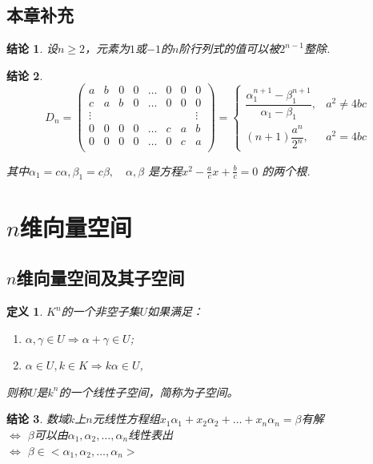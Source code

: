 \documentclass[UTF8]{article}
\newtheorem{defn}{定义}[subsection]
\newtheorem{ccl}{结论}[subsection]
\begin{document}
\subsection{本章补充}
\begin{ccl}
  设$n\ge 2$，元素为$1$或$-1$的$n$阶行列式的值可以被$2^{n-1}$整除.
\end{ccl}
\begin{ccl}
  \[
  D_n=
  \begin{pmatrix}
    a & b & 0 & 0 & \ldots & 0 & 0 & 0 \\
    c & a & b & 0 & \ldots & 0 & 0 & 0 \\
    \vdots & & & & & & & \vdots \\
    0 & 0 & 0 & 0 & \ldots & c & a & b \\
    0 & 0 & 0 & 0 & \ldots & 0 & c & a \\
  \end{pmatrix} =
  \begin{cases}
    \dfrac{\alpha_1^{n+1}-\beta_1^{n+1}}{\alpha_1-\beta_1},&a^2 \ne 4bc\\
    (n+1)\dfrac{a^n}{2^n},&a^2 = 4bc
  \end{cases}
  \]

  其中$\alpha_1=c\alpha,\beta_1=c\beta,\quad \alpha,\beta$ 是方程$x^2-\frac{a}{c}x+\frac{b}{c}=0$ 的两个根.
\end{ccl}

\section{$n$维向量空间}
\subsection{$n$维向量空间及其子空间}
\begin{defn}
  $K^n$的一个非空子集$U$如果满足：
  \begin{enumerate}
    \item $\alpha,\gamma \in U \Longrightarrow \alpha+\gamma \in U$;
    \item $\alpha \in U,k \in K \Longrightarrow k\alpha \in U$,
  \end{enumerate}
  则称$U$是$k^n$的一个线性子空间，简称为子空间。
\end{defn}
\begin{ccl}
    数域$k$上$n$元线性方程组$x_1\alpha_1+x_2\alpha_2+\ldots+x_n\alpha_n=\beta$有解\\
    $\Longleftrightarrow$ $\beta$可以由$\alpha_1,\alpha_2,\ldots,\alpha_n$线性表出\\
    $\Longleftrightarrow$ $\beta \in <\alpha_1,\alpha_2,\ldots,\alpha_n>$
\end{ccl}
\end{document}
